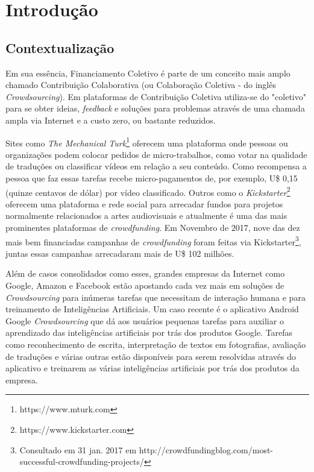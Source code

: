 \chapter{Introdução}

\section{Contextualização}
Em sua essência, Financiamento Coletivo é parte de um conceito mais amplo chamado Contribuição Colaborativa (ou Colaboração Coletiva - do inglês \emph{Crowdsourcing}). Em plataformas de Contribuição Coletiva utiliza-se do "coletivo" para se obter ideias, \emph{feedback} e soluções para problemas através de uma chamada ampla via Internet e a custo zero, ou bastante reduzidos.

Sites como \emph{The Mechanical Turk}\footnote{https://www.mturk.com} oferecem uma plataforma onde pessoas ou organizações podem colocar pedidos de micro-trabalhos, como votar na qualidade de traduções ou classificar vídeos em relação a seu conteúdo. Como recompensa a pessoa que faz essas tarefas recebe micro-pagamentos de, por exemplo, U\$ 0,15 (quinze centavos de dólar) por vídeo classificado. Outros como o \emph{Kickstarter}\footnote{https://www.kickstarter.com} oferecem uma plataforma e rede social para arrecadar fundos para projetos normalmente relacionados a artes audiovisuais e atualmente é uma das mais prominentes plataformas de \emph{crowdfunding}. Em Novembro de 2017, nove das dez mais bem financiadas campanhas de \emph{crowdfunding} foram feitas via Kickstarter\footnote{Consultado em 31 jan. 2017 em http://crowdfundingblog.com/most-successful-crowdfunding-projects/}, juntas essas campanhas arrecadaram mais de U\$ 102 milhões.

Além de casos consolidados como esses, grandes empresas da Internet como Google, Amazon e Facebook estão apostando cada vez mais em soluções de \emph{Crowdsourcing} para inúmeras tarefas que necessitam de interação humana e para treinamento de Inteligências Artificiais. Um caso recente é o aplicativo Android Google \emph{Crowdsourcing} \cite{cnet-google-crowdsourcing} que dá aos usuários pequenas tarefas para auxiliar o aprendizado das inteligências artificiais por trás dos produtos Google. Tarefas como reconhecimento de escrita, interpretação de textos em fotografias, avaliação de traduções e várias outras estão disponíveis para serem resolvidas através do aplicativo e treinarem as várias inteligências artificiais por trás dos produtos da empresa.

